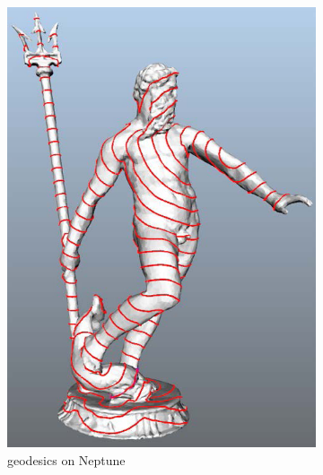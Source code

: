 \begin{figure}
         \begin{subfigure}[b]{0.5\textwidth}
                \includegraphics[width=\textwidth]{../images/geodesic_image/neptune1-1}
                \caption{geodesics on Neptune}
                \label{fig:neptune}
        \end{subfigure}%
        ~
        \begin{subfigure}[b]{0.5\textwidth}

\end{subfigure}
\end{figure}
